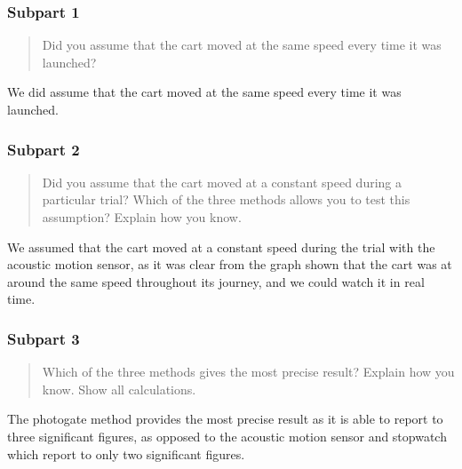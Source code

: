 \documentclass[8pt]{extarticle}
\begin{document}
{\subsubsection*{Subpart 1}
\begin{quote}
	Did you assume that the cart moved at the same speed every time it was launched?
\end{quote}
We did assume that the cart moved at the same speed every time it was launched.
\subsubsection*{Subpart 2}
\begin{quote}
	Did you assume that the cart moved at a constant speed during a particular trial? Which of the three methods allows you to test this assumption? Explain how you know.
\end{quote}
We assumed that the cart moved at a constant speed during the trial with the acoustic motion sensor, as it was clear from the graph shown that the cart was at around the same speed throughout its journey, and we could watch it in real time.
\subsubsection*{Subpart 3}
\begin{quote}
	 Which of the three methods gives the most precise result? Explain how you know. Show all calculations.
\end{quote}
The photogate method provides the most precise result as it is able to report to three significant figures, as opposed to the acoustic motion sensor and stopwatch which report to only two significant figures.
}
\end{document}
